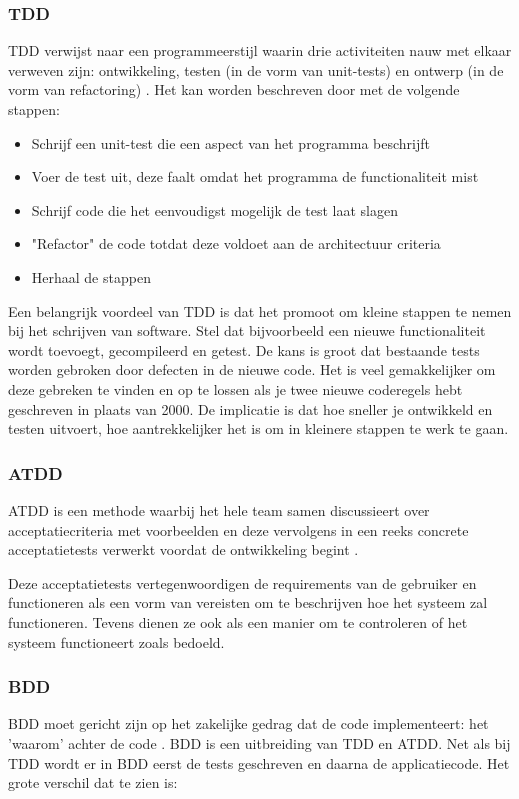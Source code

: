 \subsubsection{\acrfull{TDD}}
TDD verwijst naar een programmeerstijl waarin drie activiteiten nauw met elkaar verweven zijn: ontwikkeling, testen (in de vorm van unit-tests) en ontwerp (in de vorm van refactoring) \citep{janzen2005test}.
Het kan worden beschreven door met de volgende stappen:

\begin{itemize}[noitemsep]
    \item Schrijf een unit-test die een aspect van het programma beschrijft
    \item Voer de test uit, deze faalt omdat het programma de functionaliteit mist
    \item Schrijf code die het eenvoudigst mogelijk de test laat slagen
    \item "Refactor" de code totdat deze voldoet aan de architectuur criteria
    \item Herhaal de stappen
\end{itemize}

Een belangrijk voordeel van \acrshort{TDD} is dat het promoot om kleine stappen te nemen bij het schrijven van software. Stel dat bijvoorbeeld een nieuwe functionaliteit wordt toevoegt, gecompileerd en getest. De kans is groot dat bestaande tests worden gebroken door defecten in de nieuwe code. Het is veel gemakkelijker om deze gebreken te vinden en op te lossen als je twee nieuwe coderegels hebt geschreven in plaats van 2000. De implicatie is dat hoe sneller je ontwikkeld en testen uitvoert, hoe aantrekkelijker het is om in kleinere  stappen te werk te gaan.

\subsubsection{\acrfull{ATDD}}
\acrshort{ATDD} is een methode waarbij het hele team samen discussieert over acceptatiecriteria met voorbeelden en deze vervolgens in een reeks concrete acceptatietests verwerkt voordat de ontwikkeling begint \citep{aggarwal2014acceptance}.

Deze acceptatietests vertegenwoordigen de requirements van de gebruiker en functioneren als een vorm van vereisten om te beschrijven hoe het systeem zal functioneren. Tevens dienen ze ook als een manier om te controleren of het systeem functioneert zoals bedoeld. 

\subsubsection{\acrfull{BDD}}
\acrshort{BDD} moet gericht zijn op het zakelijke gedrag dat de code implementeert: het 'waarom' achter de code \citep{wynne2017cucumber}. \acrshort{BDD} is een uitbreiding van \acrshort{TDD} en \acrshort{ATDD}. Net als bij \acrshort{TDD} wordt er in \acrshort{BDD} eerst de tests geschreven en daarna de applicatiecode. Het grote verschil dat te zien is:

